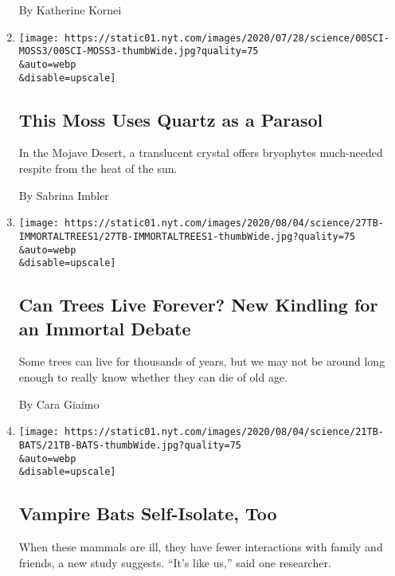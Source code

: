 \begin{enumerate}
  By Katherine Kornei
\item
  \href{/2020/07/29/science/moss-quartz-biology-syntrichia.html}{}

  \texttt{[image: https://static01.nyt.com/images/2020/07/28/science/00SCI-MOSS3/00SCI-MOSS3-thumbWide.jpg?quality=75\\\&auto=webp\\\&disable=upscale]}

  \hypertarget{this-moss-uses-quartz-as-a-parasol}{%
  \subsection{This Moss Uses Quartz as a
  Parasol}\label{this-moss-uses-quartz-as-a-parasol}}

  In the Mojave Desert, a translucent crystal offers bryophytes
  much-needed respite from the heat of the sun.

  By Sabrina Imbler
\item
  \href{/2020/07/27/science/trees-immortality.html}{}

  \texttt{[image: https://static01.nyt.com/images/2020/08/04/science/27TB-IMMORTALTREES1/27TB-IMMORTALTREES1-thumbWide.jpg?quality=75\\\&auto=webp\\\&disable=upscale]}

  \hypertarget{can-trees-live-forever-new-kindling-for-an-immortal-debate}{%
  \subsection{Can Trees Live Forever? New Kindling for an Immortal
  Debate}\label{can-trees-live-forever-new-kindling-for-an-immortal-debate}}

  Some trees can live for thousands of years, but we may not be around
  long enough to really know whether they can die of old age.

  By Cara Giaimo
\item
  \href{/2020/07/22/science/vampire-bats-viruses.html}{}

  \texttt{[image: https://static01.nyt.com/images/2020/08/04/science/21TB-BATS/21TB-BATS-thumbWide.jpg?quality=75\\\&auto=webp\\\&disable=upscale]}

  \hypertarget{vampire-bats-self-isolate-too}{%
  \subsection{Vampire Bats Self-Isolate,
  Too}\label{vampire-bats-self-isolate-too}}

  When these mammals are ill, they have fewer interactions with family
  and friends, a new study suggests. ``It's like us,'' said one
  researcher.


\end{enumerate}
